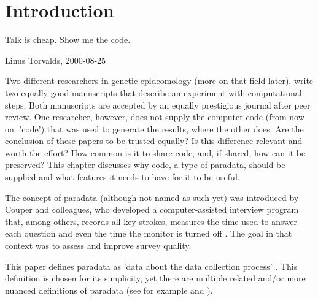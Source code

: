\section{Introduction}

\epigraph{
  Talk is cheap. Show me the code.
}{
  Linus Torvalds, 2000-08-25
}


Two different researchers in genetic epideomology (more on that field later), 
write two equally good manuscripts
that describe an experiment with computational steps.
Both manuscripts are accepted by an equally prestigious journal after peer review. 
One researcher, however, does not supply the
computer code (from now on: 'code') that was used to generate the results,
where the other does.
Are the conclusion of these papers to be trusted equally?
Is this difference relevant and worth the effort?
How common is it to share code, and, if shared, how can it be preserved?
This chapter discusses why code, a type of paradata, 
should be supplied and what features it needs to have
for it to be useful.


The concept of paradata (although not named as such yet) 
was introduced by Couper and colleagues,
who developed a computer-assisted interview program
that, among others, records all key strokes,
measures the time used to answer each question 
and even the time the monitor is turned off \cite{couper1998measuring}.
The goal in that context was to assess and improve survey quality.


This paper defines paradata as 'data about the data collection 
process' \cite{choumert2019using}.
This definition is chosen for its simplicity, 
yet there are multiple related and/or more nuanced 
definitions of paradata (see for example \cite{huvila2022improving} 
and \cite{skold2022interrogating}).

